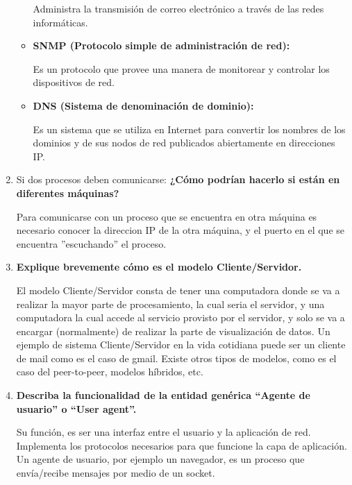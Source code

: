 \documentclass[a4paper,10pt]{article}
\begin{document}
\begin{enumerate}
\begin{itemize}
            Administra la transmisión de correo electrónico a través de las redes informáticas.

            \item \textbf{SNMP (Protocolo simple de administración de red):}

            Es un protocolo que provee una manera de monitorear y controlar los dispositivos de red.

            \item \textbf{DNS (Sistema de denominación de dominio):}

            Es un sistema que se utiliza en Internet para convertir los nombres de los dominios y de sus nodos de red publicados abiertamente en direcciones IP.

        \end{itemize}

    \item Si dos procesos deben comunicarse:
    \textbf{¿Cómo podrían hacerlo si están en diferentes máquinas?}

    Para comunicarse con un proceso que se encuentra en otra máquina es necesario conocer la direccion IP de la otra máquina, y el puerto en el que se encuentra ”escuchando” el proceso.

    \item \textbf{Explique brevemente cómo es el modelo Cliente/Servidor.}

    El modelo Cliente/Servidor consta de tener una computadora donde se va a realizar la mayor parte de procesamiento, la cual seria el servidor, y una computadora la cual accede al servicio provisto por el servidor, y solo se va a encargar (normalmente) de realizar la parte de visualización de datos. Un ejemplo de sistema Cliente/Servidor en la vida cotidiana puede ser un cliente de mail como es el caso de gmail. Existe otros tipos de modelos, como es el caso del peer-to-peer, modelos híbridos, etc.

    \item \textbf{Describa la funcionalidad de la entidad genérica “Agente de usuario” o “User agent”.}

    Su función, es ser una interfaz entre el usuario y la aplicación de red. Implementa los protocolos necesarios para que funcione la capa de aplicación. Un agente de usuario, por ejemplo un navegador, es un proceso que envía/recibe mensajes por medio de un socket.

\end{enumerate}
\end{document}
